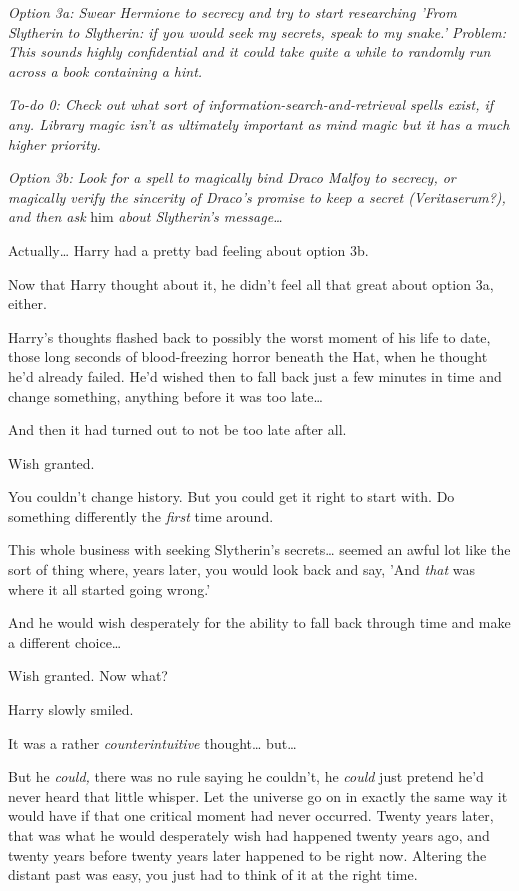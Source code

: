 \emph{Option 3a: Swear Hermione to secrecy and try to start researching 'From 
Slytherin to Slytherin: if you would seek my secrets, speak to my snake.' 
Problem: This sounds highly confidential and it could take quite a while to 
randomly run across a book containing a hint.}

\emph{To-do 0: Check out what sort of information-search-and-retrieval spells 
exist, if any. Library magic isn't as ultimately important as mind magic but it 
has a much higher priority.}

\emph{Option 3b: Look for a spell to magically bind Draco Malfoy to secrecy, or 
magically verify the sincerity of Draco's promise to keep a secret 
(Veritaserum?), and then ask} him\emph{ about Slytherin's message{\ldots}}

Actually{\ldots} Harry had a pretty bad feeling about option 3b.

Now that Harry thought about it, he didn't feel all that great about option 3a, 
either.

Harry's thoughts flashed back to possibly the worst moment of his life to date, 
those long seconds of blood-freezing horror beneath the Hat, when he thought 
he'd already failed. He'd wished then to fall back just a few minutes in time 
and change something, anything before it was too late{\ldots}

And then it had turned out to not be too late after all.

Wish granted.

You couldn't change history. But you could get it right to start with. Do 
something differently the \emph{first} time around.

This whole business with seeking Slytherin's secrets{\ldots} seemed an awful 
lot like the sort of thing where, years later, you would look back and say, 
'And \emph{that} was where it all started going wrong.'

And he would wish desperately for the ability to fall back through time and 
make a different choice{\ldots}

Wish granted. Now what?

Harry slowly smiled.

It was a rather \emph{counterintuitive} thought{\ldots} but{\ldots}

But he \emph{could,} there was no rule saying he couldn't, he \emph{could} just 
pretend he'd never heard that little whisper. Let the universe go on in exactly 
the same way it would have if that one critical moment had never occurred. 
Twenty years later, that was what he would desperately wish had happened twenty 
years ago, and twenty years before twenty years later happened to be right now. 
Altering the distant past was easy, you just had to think of it at the right 
time.

